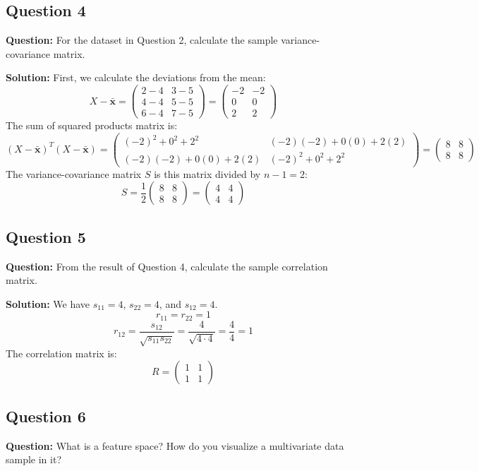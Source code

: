 \subsection*{Question 4}
\textbf{Question:} For the dataset in Question 2, calculate the sample variance-covariance matrix.

\textbf{Solution:}
First, we calculate the deviations from the mean:
$$ X - \bar{\mathbf{x}} = \begin{pmatrix} 2-4 & 3-5 \\ 4-4 & 5-5 \\ 6-4 & 7-5 \end{pmatrix} = \begin{pmatrix} -2 & -2 \\ 0 & 0 \\ 2 & 2 \end{pmatrix} $$
The sum of squared products matrix is:
$$ (X - \bar{\mathbf{x}})^T (X - \bar{\mathbf{x}}) = \begin{pmatrix} (-2)^2+0^2+2^2 & (-2)(-2)+0(0)+2(2) \\ (-2)(-2)+0(0)+2(2) & (-2)^2+0^2+2^2 \end{pmatrix} = \begin{pmatrix} 8 & 8 \\ 8 & 8 \end{pmatrix} $$
The variance-covariance matrix $S$ is this matrix divided by $n-1 = 2$:
$$ S = \frac{1}{2} \begin{pmatrix} 8 & 8 \\ 8 & 8 \end{pmatrix} = \begin{pmatrix} 4 & 4 \\ 4 & 4 \end{pmatrix} $$

\subsection*{Question 5}
\textbf{Question:} From the result of Question 4, calculate the sample correlation matrix.

\textbf{Solution:}
We have $s_{11}=4$, $s_{22}=4$, and $s_{12}=4$.
$$ r_{11} = r_{22} = 1 $$
$$ r_{12} = \frac{s_{12}}{\sqrt{s_{11}s_{22}}} = \frac{4}{\sqrt{4 \cdot 4}} = \frac{4}{4} = 1 $$
The correlation matrix is:
$$ R = \begin{pmatrix} 1 & 1 \\ 1 & 1 \end{pmatrix} $$

\subsection*{Question 6}
\textbf{Question:} What is a feature space? How do you visualize a multivariate data sample in it?

